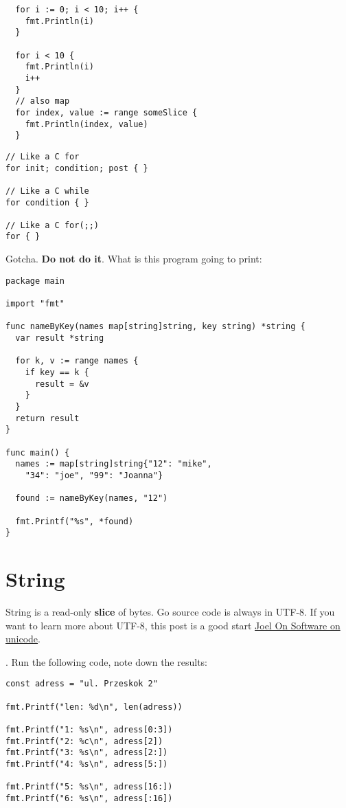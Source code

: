 \documentclass[11pt, letterpaper]{article}
\begin{document}
\begin{verbatim}
  for i := 0; i < 10; i++ {
    fmt.Println(i)
  }

  for i < 10 {
    fmt.Println(i)
    i++
  }
  // also map
  for index, value := range someSlice {
    fmt.Println(index, value)
  }
\end{verbatim}

\begin{verbatim}
// Like a C for
for init; condition; post { }

// Like a C while
for condition { }

// Like a C for(;;)
for { }
\end{verbatim}

\bigskip

Gotcha. \textbf{Do not do it}. What is this program going to print:

\begin{verbatim}
package main

import "fmt"

func nameByKey(names map[string]string, key string) *string {
  var result *string

  for k, v := range names {
    if key == k {
      result = &v
    }
  }
  return result
}

func main() {
  names := map[string]string{"12": "mike",
    "34": "joe", "99": "Joanna"}

  found := nameByKey(names, "12")

  fmt.Printf("%s", *found)
}
\end{verbatim}

\section{String}

String is a read-only \textbf{slice} of bytes. Go source code is always in {\small UTF}-8. If you want to learn more about UTF-8, this post is a good start \href{https://www.joelonsoftware.com/2003/10/08/the-absolute-minimum-every-software-developer-absolutely-positively-must-know-about-unicode-and-character-sets-no-excuses/}{Joel On Software on unicode}.

. Run the following code, note down the results:

\begin{verbatim}
const adress = "ul. Przeskok 2"

fmt.Printf("len: %d\n", len(adress))

fmt.Printf("1: %s\n", adress[0:3])
fmt.Printf("2: %c\n", adress[2])
fmt.Printf("3: %s\n", adress[2:])
fmt.Printf("4: %s\n", adress[5:])

fmt.Printf("5: %s\n", adress[16:])
fmt.Printf("6: %s\n", adress[:16])
\end{verbatim}
\end{document}
